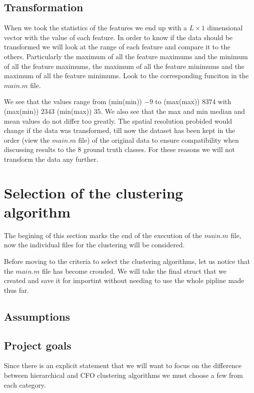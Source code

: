 \documentclass[12pt, a4paper]{article}
\begin{document}
\subsection{Transformation}

When we took the statistics of the features we end up with a $L\times1$ dimensional vector with the value of each feature. In order to know if the data should be transformed we will look at the range of each feature and compare it to the others. Particularly the maximum of all the feature maximums and the minimum of all the feature maximums, the maximum of all the feature minimums and the maximum of all the feature minimums. Look to the corresponding funciton in the $main.m$ file.
\newline

We see that the values range from (min(min)) $-9$ to (max(max)) $8374$ with (max(min)) $2343$ (min(max)) $35$. We also see that the max and min median and mean values do not differ too greatly. The spatial resolution probided would change if the data was transformed, till now the dataset has been kept in the order (view the $main.m$ file) of the original data to ensure compatibility when discussing results to the 8 ground truth classes. For these reasons we will not transform the data any further.

\section{Selection of the clustering algorithm}

The begining of this section marks the end of the execution of the $main.m$ file, now the individual files for the clustering will be considered.

Before moving to the criteria to select the clustering algorithms, let us notice that the $main.m$ file has become crouded. We will take the final struct that we created and save it for importint without needing to use the whole pipline made thus far.

\subsection{Assumptions}

\subsection{Project goals}

Since there is an explicit statement that we will want to focus on the difference between hierarchical and CFO clustering algorithms we must choose a few from each category.
\newline
\end{document}
